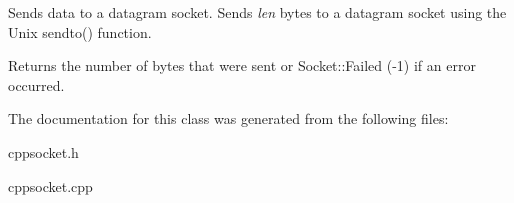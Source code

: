 Sends data to a datagram socket. Sends {\itshape len} bytes to a datagram socket using the Unix sendto() function. 

\begin{DoxyReturn}{Returns}
the number of bytes that were sent or Socket\+::\+Failed (-\/1) if an error occurred. 
\end{DoxyReturn}


The documentation for this class was generated from the following files\+:\begin{DoxyCompactItemize}
\item 
cppsocket.\+h\item 
cppsocket.\+cpp\end{DoxyCompactItemize}
